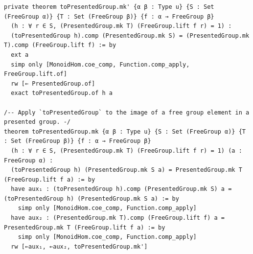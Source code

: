 \documentclass[10pt,a4paper]{article}
\begin{document}
\begin{Verbatim}
private theorem toPresentedGroup.mk' {α β : Type u} {S : Set (FreeGroup α)} {T : Set (FreeGroup β)} {f : α → FreeGroup β}
  (h : ∀ r ∈ S, (PresentedGroup.mk T) (FreeGroup.lift f r) = 1) :
  (toPresentedGroup h).comp (PresentedGroup.mk S) = (PresentedGroup.mk T).comp (FreeGroup.lift f) := by
  ext a
  simp only [MonoidHom.coe_comp, Function.comp_apply, FreeGroup.lift.of]
  rw [← PresentedGroup.of]
  exact toPresentedGroup.of h a

/-- Apply `toPresentedGroup` to the image of a free group element in a presented group. -/
theorem toPresentedGroup.mk {α β : Type u} {S : Set (FreeGroup α)} {T : Set (FreeGroup β)} {f : α → FreeGroup β}
  (h : ∀ r ∈ S, (PresentedGroup.mk T) (FreeGroup.lift f r) = 1) (a : FreeGroup α) :
  (toPresentedGroup h) (PresentedGroup.mk S a) = PresentedGroup.mk T (FreeGroup.lift f a) := by
  have aux₁ : (toPresentedGroup h).comp (PresentedGroup.mk S) a = (toPresentedGroup h) (PresentedGroup.mk S a) := by
    simp only [MonoidHom.coe_comp, Function.comp_apply]
  have aux₂ : (PresentedGroup.mk T).comp (FreeGroup.lift f) a = PresentedGroup.mk T (FreeGroup.lift f a) := by
    simp only [MonoidHom.coe_comp, Function.comp_apply]
  rw [←aux₁, ←aux₂, toPresentedGroup.mk']
\end{Verbatim}
\end{document}
